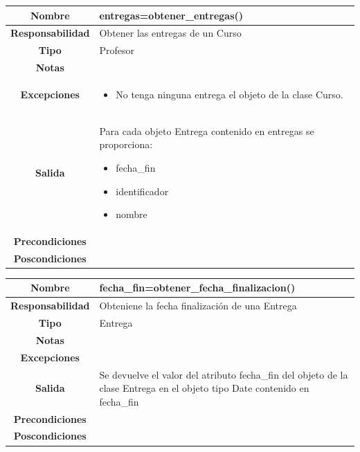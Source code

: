                        \begin{table}[!ht]
\begin{tabular}{|c|m{10cm}|}
\hline\rowcolor{Gray}
{\bf Nombre } & {entregas=obtener\_entregas()}\\
\hline
{\bf Responsabilidad } & {Obtener las entregas de un Curso}\\
\hline
\rowcolor{Gray}
{\bf Tipo } & {Profesor} \\
\hline
{\bf Notas } & { } \\
\hline
\rowcolor{Gray}
{\bf Excepciones }& {
\begin{itemize}
\item No tenga ninguna entrega el objeto de la clase Curso.
\end{itemize}
} \\
\hline
{\bf Salida }& 
	  { 	
	  Para cada objeto Entrega contenido en entregas se proporciona:
	  \begin{itemize}
	  \item fecha\_fin
	  \item identificador
	  \item nombre
	  \end{itemize}	  } 
 \\
\hline
\rowcolor{Gray}
{\bf Precondiciones }& {
}\\
\hline
{\bf Poscondiciones }& {
}
  \\
\hline
\end{tabular}

\end{table}




                       \begin{table}[!ht]
\begin{tabular}{|c|m{10cm}|}
\hline\rowcolor{Gray}
{\bf Nombre } & {fecha\_fin=obtener\_fecha\_finalizacion()}\\
\hline
{\bf Responsabilidad } & {Obteniene la fecha finalización de una Entrega}\\
\hline
\rowcolor{Gray}
{\bf Tipo } & {Entrega} \\
\hline
{\bf Notas } & { } \\
\hline
\rowcolor{Gray}
{\bf Excepciones }& {
} \\
\hline
{\bf Salida }& 
	  { 	
	  Se devuelve el valor del atributo fecha\_fin del objeto de la clase Entrega en el objeto tipo Date contenido en fecha\_fin } 
 \\
\hline
\rowcolor{Gray}
{\bf Precondiciones }& {
}\\
\hline
{\bf Poscondiciones }& {
}
  \\
\hline
\end{tabular}

\end{table}




